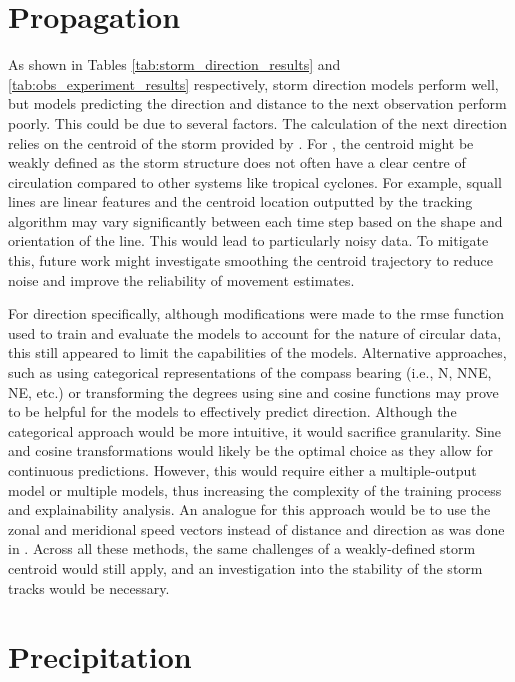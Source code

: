 \section{Propagation}
\label{sec:discuss-propagation}

As shown in Tables \ref{tab:storm_direction_results} and \ref{tab:obs_experiment_results} respectively, storm direction models perform well, but models predicting the direction and distance to the next observation perform poorly. This could be due to several factors. The calculation of the next direction relies on the centroid of the storm provided by \cite{Hill2023}. For , the centroid might be weakly defined as the storm structure does not often have a clear centre of circulation compared to other systems like tropical cyclones. For example, squall lines are linear features and the centroid location outputted by the tracking algorithm may vary significantly between each time step based on the shape and orientation of the line. This would lead to particularly noisy data. To mitigate this, future work might investigate smoothing the centroid trajectory to reduce noise and improve the reliability of movement estimates.

For direction specifically, although modifications were made to the \acrshort{rmse} function used to train and evaluate the models to account for the nature of circular data, this still appeared to limit the capabilities of the models. Alternative approaches, such as using categorical representations of the compass bearing (i.e., N, NNE, NE, etc.) or transforming the degrees using sine and cosine functions may prove to be helpful for the models to effectively predict direction. Although the categorical approach would be more intuitive, it would sacrifice granularity. Sine and cosine transformations would likely be the optimal choice as they allow for continuous predictions. However, this would require either a multiple-output model or multiple models, thus increasing the complexity of the training process and explainability analysis. An analogue for this approach would be to use the zonal and meridional speed vectors instead of distance and direction as was done in \cite{Hunt2024}. Across all these methods, the same challenges of a weakly-defined storm centroid would still apply, and an investigation into the stability of the storm tracks would be necessary.

\section{Precipitation}

